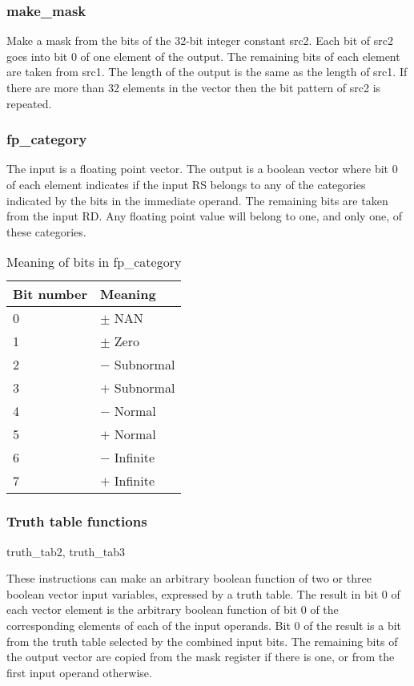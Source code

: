 \documentclass[forwardcom.tex]{subfiles}
\begin{document}
\subsubsection{make\_mask}
Make a mask from the bits of the 32-bit integer constant src2. Each bit of src2 goes into bit 0 of one element of the output. The remaining bits of each element are taken from src1. The length of the output is the same as the length of src1. If there are more than 32 elements in the vector then the bit pattern of src2 is repeated.


\subsubsection{fp\_category}
The input is a floating point vector. The output is a boolean vector where bit 0 of each element indicates if the input RS belongs to any of the categories indicated by the bits in the immediate operand. The remaining bits are taken from the input RD. Any floating point value will belong to one, and only one, of these categories. 

\begin{longtable} {|p{20mm}|p{90mm}|}
\caption{Meaning of bits in fp\_category} 
\label{table:fpCategoryInstructionBits} \\
\endfirsthead
\endhead
\hline
\bfseries Bit number & \bfseries Meaning  \\
\hline
0 & $\pm$ NAN \\
1 & $\pm$ Zero \\
2 & $-$ Subnormal \\
3 & $+$ Subnormal \\
4 & $-$ Normal \\
5 & $+$ Normal \\
6 & $-$ Infinite  \\
7 & $+$ Infinite  \\
\hline
\end{longtable}
  

\subsubsection{Truth table functions} \label{truthTableFunctions}
truth\_tab2, truth\_tab3
\vspace{2mm}

These instructions can make an arbitrary boolean function of two or three boolean vector input variables, expressed by a truth table. The result in bit 0 of each vector element is the arbitrary boolean function of bit 0 of the corresponding elements of each of the input operands. Bit 0 of the result is a bit from the truth table selected by the combined input bits. The remaining bits of the output vector are copied from the mask register if there is one, or from the first input operand otherwise. 
\vspace{2mm}
\end{document}

